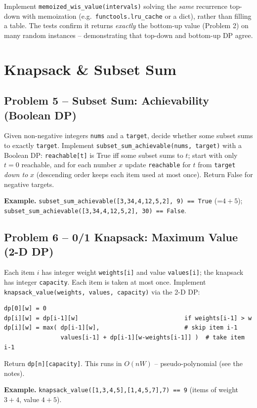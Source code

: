 \documentclass[11pt]{article}
\begin{document}
Implement \texttt{memoized\_wis\_value(intervals)} solving the \emph{same} recurrence
top-down with memoization (e.g.\ \texttt{functools.lru\_cache} or a dict), rather than
filling a table. The tests confirm it returns \emph{exactly} the bottom-up value (Problem
2) on many random instances -- demonstrating that top-down and bottom-up DP agree.

\newpage
\section{Knapsack \& Subset Sum}

\subsection*{Problem 5 -- Subset Sum: Achievability (Boolean DP)}

Given non-negative integers \texttt{nums} and a \texttt{target}, decide whether some subset
sums to exactly \texttt{target}. Implement \texttt{subset\_sum\_achievable(nums, target)}
with a Boolean DP: \texttt{reachable[t]} is True iff some subset sums to $t$; start with
only $t=0$ reachable, and for each number $x$ update \texttt{reachable} for $t$ from
\texttt{target} \emph{down to} $x$ (descending order keeps each item used at most once).
Return False for negative targets.

\textbf{Example.} \texttt{subset\_sum\_achievable([3,34,4,12,5,2], 9) == True} (=$4+5$);
\texttt{subset\_sum\_achievable([3,34,4,12,5,2], 30) == False}.

\subsection*{Problem 6 -- 0/1 Knapsack: Maximum Value (2-D DP)}

Each item $i$ has integer weight \texttt{weights[i]} and value \texttt{values[i]}; the
knapsack has integer \texttt{capacity}. Each item is taken at most once. Implement
\texttt{knapsack\_value(weights, values, capacity)} via the 2-D DP:
\begin{verbatim}
dp[0][w] = 0
dp[i][w] = dp[i-1][w]                              if weights[i-1] > w
dp[i][w] = max( dp[i-1][w],                        # skip item i-1
                values[i-1] + dp[i-1][w-weights[i-1]] )  # take item i-1
\end{verbatim}
Return \texttt{dp[n][capacity]}. This runs in $O(nW)$ -- pseudo-polynomial (see the notes).

\textbf{Example.} \texttt{knapsack\_value([1,3,4,5],[1,4,5,7],7) == 9} (items of weight
$3{+}4$, value $4{+}5$).
\end{document}
